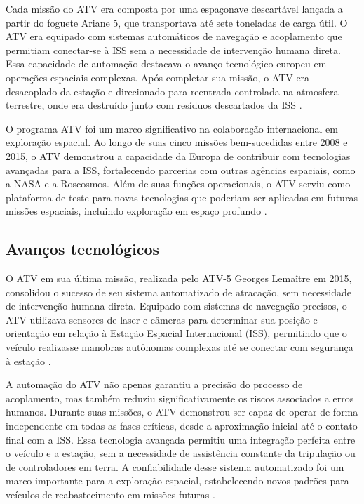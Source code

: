 Cada missão do ATV era composta por uma espaçonave descartável lançada a partir do foguete Ariane 5, que transportava até sete toneladas de carga útil. O ATV era equipado com sistemas automáticos de navegação e acoplamento que permitiam conectar-se à ISS sem a necessidade de intervenção humana direta. Essa capacidade de automação destacava o avanço tecnológico europeu em operações espaciais complexas. Após completar sua missão, o ATV era desacoplado da estação e direcionado para reentrada controlada na atmosfera terrestre, onde era destruído junto com resíduos descartados da ISS \citep{esaATV}.

O programa ATV foi um marco significativo na colaboração internacional em exploração espacial. Ao longo de suas cinco missões bem-sucedidas entre 2008 e 2015, o ATV demonstrou a capacidade da Europa de contribuir com tecnologias avançadas para a ISS, fortalecendo parcerias com outras agências espaciais, como a NASA e a Roscosmos. Além de suas funções operacionais, o ATV serviu como plataforma de teste para novas tecnologias que poderiam ser aplicadas em futuras missões espaciais, incluindo exploração em espaço profundo \citep{esaATV}.

\subsection{Avanços tecnológicos}

O ATV em sua última missão, realizada pelo ATV-5 Georges Lemaître em 2015, consolidou o sucesso de seu sistema automatizado de atracação, sem necessidade de intervenção humana direta. Equipado com sistemas de navegação precisos, o ATV utilizava sensores de laser e câmeras para determinar sua posição e orientação em relação à Estação Espacial Internacional (ISS), permitindo que o veículo realizasse manobras autônomas complexas até se conectar com segurança à estação \citep{esaATVFinal}.

A automação do ATV não apenas garantiu a precisão do processo de acoplamento, mas também reduziu significativamente os riscos associados a erros humanos. Durante suas missões, o ATV demonstrou ser capaz de operar de forma independente em todas as fases críticas, desde a aproximação inicial até o contato final com a ISS. Essa tecnologia avançada permitiu uma integração perfeita entre o veículo e a estação, sem a necessidade de assistência constante da tripulação ou de controladores em terra. A confiabilidade desse sistema automatizado foi um marco importante para a exploração espacial, estabelecendo novos padrões para veículos de reabastecimento em missões futuras \citep{esaATVFinal}.

